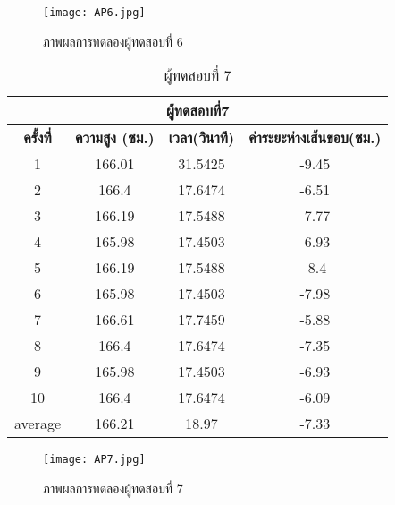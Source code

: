 \begin{figure}[!ht]
\centering
\texttt{[image: AP6.jpg]}
\caption{ภาพผลการทดลองผู้ทดสอบที่ 6 }
\label{fig:AP6.jpg}
\end{figure}


\begin{table}[!hb] 
\centering
\caption{ผู้ทดสอบที่ 7}
\label{tab:8}
\begin{tabular}{|c|c|c|c|}
\hline
\multicolumn{4}{|c|}{\textbf{ผู้ทดสอบที่7}}    \\ \hline
\textbf{ครั้งที่} & \textbf{ความสูง (ซม.)} & \textbf{เวลา(วินาที)} & \textbf{ค่าระยะห่างเส้นขอบ(ซม.)}  \\ \hline
1       & 166.01 & 31.5425 & -9.45  \\ \hline
2       & 166.4  & 17.6474 & -6.51   \\ \hline
3       & 166.19 & 17.5488 & -7.77   \\ \hline
4       & 165.98 & 17.4503 & -6.93  \\ \hline
5       & 166.19 & 17.5488 & -8.4   \\ \hline
6       & 165.98 & 17.4503 & -7.98  \\ \hline
7       & 166.61 & 17.7459 & -5.88  \\ \hline
8       & 166.4  & 17.6474 & -7.35  \\ \hline
9       & 165.98 & 17.4503 & -6.93    \\ \hline
10      & 166.4  & 17.6474 & -6.09  \\ \hline
average & 166.21 & 18.97   & -7.33      \\ \hline
\end{tabular}
\end{table}

\begin{figure}[!ht]
\centering
\texttt{[image: AP7.jpg]}
\caption{ภาพผลการทดลองผู้ทดสอบที่ 7 }
\label{fig:AP7.jpg}
\end{figure}


